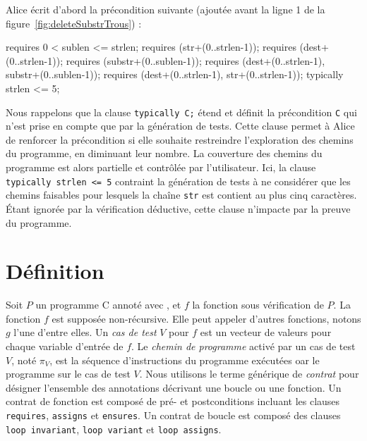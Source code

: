 Alice écrit d'abord la précondition suivante (ajoutée avant la ligne 1 de la
figure~\ref{fig:deleteSubstrTrous}) :

\begin{pretty-codeACSL}
requires 0 < sublen <= strlen;
requires \valid(str+(0..strlen-1));
requires \valid(dest+(0..strlen-1));
requires \valid(substr+(0..sublen-1));
requires \separated(dest+(0..strlen-1), substr+(0..sublen-1));
requires \separated(dest+(0..strlen-1), str+(0..strlen-1));
typically strlen <= 5;
\end{pretty-codeACSL}

Nous rappelons que la clause \lstinline{typically C;} étend \eacsl et définit la
précondition \lstinline{C} qui n'est prise en compte que par la génération de
tests.
Cette clause permet à Alice de renforcer la précondition si elle souhaite
restreindre l'exploration des chemins du programme, en diminuant leur nombre.
La couverture des chemins du programme est alors partielle et contrôlée par
l'utilisateur.
Ici, la clause \lstinline{typically strlen <= 5} contraint la génération de
tests à ne considérer que les chemins faisables pour lesquels la chaîne
\lstinline{str} est contient au plus cinq caractères.
Étant ignorée par la vérification déductive, cette clause n'impacte par la
preuve du programme.


\section{Définition}
\label{sec:ncd-def}


Soit $P$ un programme C annoté avec \eacsl, et $f$ la fonction sous vérification
de $P$.
La fonction $f$ est supposée non-récursive.
Elle peut appeler d'autres fonctions, notons $g$ l'une d'entre elles.
Un \emph{cas de test} $V$ pour $f$ est un vecteur de valeurs pour chaque
variable d'entrée de $f$.
Le \emph{chemin de programme} activé par un cas de test $V$, noté $\pi_V$, est
la séquence d'instructions du programme exécutées oar le programme sur le cas
de test $V$.
Nous utilisons le terme générique de \emph{contrat} pour désigner l'ensemble des
annotations \eacsl décrivant une boucle ou une fonction. 
Un contrat de fonction est composé de pré- et postconditions incluant les
clauses \lstinline{requires}, \lstinline{assigns} et \lstinline{ensures}.
Un contrat de boucle est composé des clauses \lstinline{loop invariant},
\lstinline{loop variant} et \lstinline{loop assigns}.


